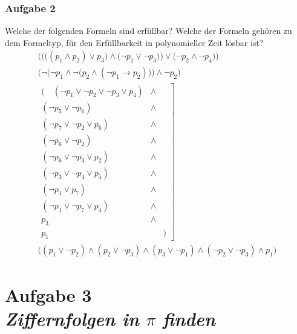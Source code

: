 \documentclass{beamer}
\begin{document}
	\begin{frame} \frametitle{Aufgabe 2}
		\justifying \footnotesize
		Welche der folgenden Formeln sind erfüllbar? 
		Welche der Formeln gehören zu dem Formeltyp, für den Erfüllbarkeit in polynomieller Zeit lösbar ist?
		\begin{gather}
			\bigg( \Big( \big( (p_1 \land p_2) \lor p_3 \big) \land \big( \lnot p_1 \lor \lnot p_3 \big) \Big) \lor \Big( \lnot p_2 \land \lnot p_4 \Big) \bigg)			
			\\
			\bigg( \lnot \Big( \lnot p_1 \land \lnot \big(p_2 \land (\lnot p_1 \to p_2 ) \big) \Big) \land \lnot p_2 \bigg)
			\\
			\left.\begin{array}{rcl}
				\Big(  \quad
				(\lnot p_1 \lor \lnot p_2 \lor \lnot p_3 \lor p_4) & \land & \\
				(\lnot p_5 \lor \lnot p_6) & \land & \\
				(\lnot p_7 \lor \lnot p_2 \lor p_6) & \land & \\
				(\lnot p_6 \lor \lnot p_2) & \land & \\
				(\lnot p_6 \lor \lnot p_3 \lor p_2) & \land & \\
				(\lnot p_3 \lor \lnot p_4 \lor p_5) & \land & \\
				(\lnot p_1 \lor p_7) & \land & \\
				(\lnot p_1 \lor \lnot p_7 \lor p_4) & \land & \\				
				p_3 &\land& \\
				p_1 && \Big)
			\end{array} \right] \\			
			\Big( (p_1 \lor \lnot p_2) \land (p_2 \lor \lnot p_3) \land (p_3 \lor \lnot p_1) \land (\lnot p_2 \lor \lnot p_3) \land p_1 \Big)
		\end{gather}
	\end{frame}
	

	\section{Aufgabe 3 \\ \itshape Ziffernfolgen in $\pi$ finden}
	
\end{document}
